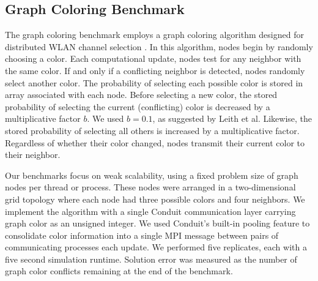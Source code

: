 \subsection{ Graph Coloring Benchmark } \label{sec:graph-coloring-benchmark}

The graph coloring benchmark employs a graph coloring algorithm designed for distributed WLAN channel selection \citep{leith2012wlan}.
In this algorithm, nodes begin by randomly choosing a color.
Each computational update, nodes test for any neighbor with the same color.
If and only if a conflicting neighbor is detected, nodes randomly select another color.
The probability of selecting each possible color is stored in array associated with each node.
Before selecting a new color, the stored probability of selecting the current (conflicting) color is decreased by a multiplicative factor $b$.
We used $b=0.1$, as suggested by Leith et al.
Likewise, the stored probability of selecting all others is increased by a multiplicative factor.
Regardless of whether their color changed, nodes transmit their current color to their neighbor.

Our benchmarks focus on weak scalability, using a fixed problem size of  graph nodes per thread or process.
These nodes were arranged in a two-dimensional grid topology where each node had three possible colors and four neighbors.
We implement the algorithm with a single Conduit communication layer carrying graph color as an unsigned integer.
We used Conduit's built-in pooling feature to consolidate color information into a single MPI message between pairs of communicating processes each update.
We performed five replicates, each with a five second simulation runtime.
Solution error was measured as the number of graph color conflicts remaining at the end of the benchmark.
